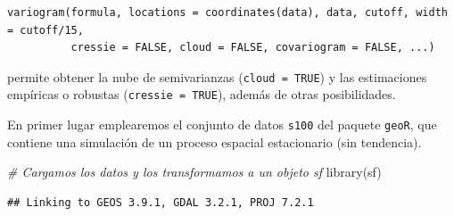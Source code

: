 \documentclass[
  spanish,
]{book}
\newenvironment{Shaded}{\begin{snugshade}}{\end{snugshade}}
\newcommand{\AttributeTok}[1]{\textcolor[rgb]{0.77,0.63,0.00}{#1}}
\newcommand{\CommentTok}[1]{\textcolor[rgb]{0.56,0.35,0.01}{\textit{#1}}}
\newcommand{\ConstantTok}[1]{\textcolor[rgb]{0.00,0.00,0.00}{#1}}
\newcommand{\DecValTok}[1]{\textcolor[rgb]{0.00,0.00,0.81}{#1}}
\newcommand{\FloatTok}[1]{\textcolor[rgb]{0.00,0.00,0.81}{#1}}
\newcommand{\FunctionTok}[1]{\textcolor[rgb]{0.00,0.00,0.00}{#1}}
\newcommand{\NormalTok}[1]{#1}
\newcommand{\OtherTok}[1]{\textcolor[rgb]{0.56,0.35,0.01}{#1}}
\newcommand{\SpecialCharTok}[1]{\textcolor[rgb]{0.00,0.00,0.00}{#1}}
\newcommand{\StringTok}[1]{\textcolor[rgb]{0.31,0.60,0.02}{#1}}
\theoremstyle{break}
\begin{document}
\begin{verbatim}
variogram(formula, locations = coordinates(data), data, cutoff, width = cutoff/15,
          cressie = FALSE, cloud = FALSE, covariogram = FALSE, ...)
\end{verbatim}

permite obtener la nube de semivarianzas (\texttt{cloud\ =\ TRUE}) y las estimaciones
empíricas o robustas (\texttt{cressie\ =\ TRUE}), además de otras posibilidades.

En primer lugar emplearemos el conjunto de datos \texttt{s100} del paquete \texttt{geoR}, que contiene una simulación de un proceso espacial estacionario (sin tendencia).

\begin{Shaded}
\begin{Highlighting}[]
\CommentTok{\# Cargamos los datos y los transformamos a un objeto \textasciigrave{}sf\textasciigrave{}}
\FunctionTok{library}\NormalTok{(sf)}
\end{Highlighting}
\end{Shaded}

\begin{verbatim}
## Linking to GEOS 3.9.1, GDAL 3.2.1, PROJ 7.2.1
\end{verbatim}

\begin{Shaded}
\end{Shaded}

\begin{Shaded}
\end{Shaded}
\end{document}

